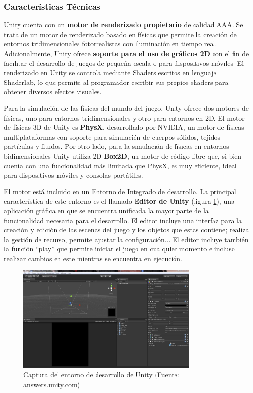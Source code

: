 \subsubsection{Características Técnicas}
Unity cuenta con un \textbf{motor de renderizado propietario} de calidad AAA. Se trata de un motor de renderizado basado en físicas que permite la creación de entornos tridimensionales fotorrealistas con iluminación en tiempo real. Adicionalmente, Unity ofrece \textbf{soporte para el uso de gráficos 2D} con el fin de facilitar el desarrollo de juegos de pequeña escala o para dispositivos móviles. El renderizado en Unity se controla mediante Shaders escritos en lenguaje Shaderlab, lo que permite al programador escribir sus propios shaders para obtener diversos efectos visuales. 

Para la simulación de las físicas del mundo del juego, Unity ofrece dos motores de físicas, uno para entornos tridimensionales y otro para entornos en 2D. El motor de físicas 3D de Unity es \textbf{PhysX}, desarrollado por NVIDIA, un motor de físicas multiplataformas con soporte para simulación de cuerpos sólidos, tejidos partículas y fluidos. Por otro lado, para la simulación de físicas en entornos bidimensionales Unity utiliza 2D \textbf{Box2D}, un motor de código libre que, si bien cuenta con una funcionalidad más limitada que PhysX, es muy eficiente, ideal para dispositivos móviles y consolas portátiles.

El motor está incluido en un Entorno de Integrado de desarrollo. La principal característica de este entorno es el llamado \textbf{Editor de Unity} (figura \ref{captura-unity}), una aplicación gráfica en que se encuentra unificada la mayor parte de la funcionalidad necesaria para el desarrollo. El editor incluye una interfaz para la creación y edición de las escenas del juego y los objetos que estas contiene; realiza la gestión de recurso, permite ajustar la configuración... El editor incluye también la función ``play'' que permite iniciar el juego en cualquier momento e incluso realizar cambios en este mientras se encuentra en ejecución.

\begin{figure}[h]
	\includegraphics[width=0.8\textwidth]{images/estadodelarte/motores/captura-unity}
	\centering
	\caption{Captura del entorno de desarrollo de Unity (Fuente: answers.unity.com)}
	\label{captura-unity}
\end{figure}

